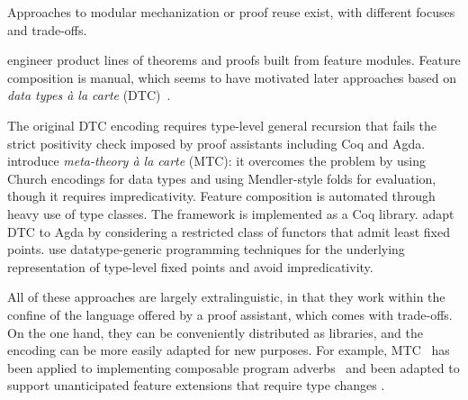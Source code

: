 Approaches to modular mechanization or proof reuse exist,
with different focuses and trade-offs.


\citet{delaware2011} engineer product lines of theorems and proofs built
from feature modules. Feature composition is manual, which seems to have
motivated later approaches based on \emph{data types à la carte} (DTC)~\cite{dtc}.

The original DTC encoding requires type-level general recursion that
fails the strict positivity check imposed by proof assistants including Coq and Agda.
\citet{delaware2013} introduce \emph{meta-theory à la carte} (MTC):
it overcomes the problem by using Church encodings for
data types and using Mendler-style folds for evaluation,
though it requires  impredicativity.
Feature composition is automated through heavy use of type classes.
The framework is implemented as a Coq library.
\citet{schwaab2013modular} adapt DTC to Agda by considering a restricted
class of functors that admit least fixed points.
\citet{keuchel2013generic} use datatype-generic programming techniques
for the underlying representation of type-level fixed points and
avoid  impredicativity.

All of these approaches are largely extra\-linguistic, in that they work
within the confine of the language offered by a proof assistant, which
comes with trade-offs.
On the one hand,
they can be conveniently distributed as libraries, and the encoding can
be more easily adapted for new purposes.
For example, MTC~\cite{delaware2013} has been applied to implementing
composable program adverbs~\cite{liwei2022} and been adapted to support
unanticipated feature extensions that require type changes
\cite{delaware2013b}.

